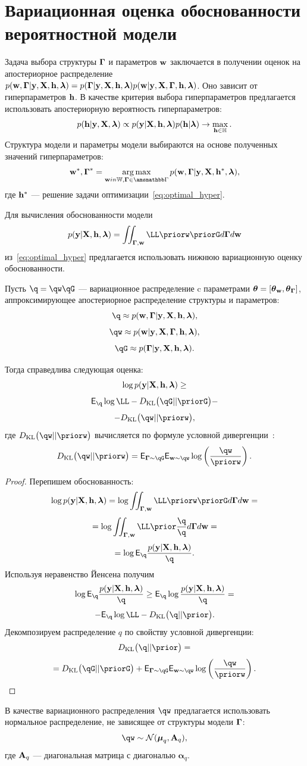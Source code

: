 \section{Вариационная оценка обоснованности вероятностной модели}
Задача выбора структуры $\boldsymbol{\Gamma}$ и параметров $\mathbf{w}$ заключается в получении оценок на апостериорное распределение $p(\mathbf{w}, \boldsymbol{\Gamma}|\mathbf{y}, \mathbf{X}, \mathbf{h},\boldsymbol{\lambda}) = p(\boldsymbol{\Gamma}|\mathbf{y}, \mathbf{X}, \mathbf{h},\boldsymbol{\lambda})p(\mathbf{w}|\mathbf{y}, \mathbf{X}, \boldsymbol{\Gamma}, \mathbf{h},\boldsymbol{\lambda})$. Оно зависит от гиперпараметров $\mathbf{h}$. 
В качестве критерия выбора гиперпараметров предлагается использовать апостериорную вероятность гиперпараметров:
\begin{equation}
\label{eq:optimal_hyper}
    p(\mathbf{h}|\mathbf{y}, \mathbf{X},\boldsymbol{\lambda}) \propto p(\mathbf{y}|\mathbf{X}, \mathbf{h},\boldsymbol{\lambda}) p(\mathbf{h}|\boldsymbol{\lambda}) \to \max_{\mathbf{h} \in \mathbb{H}}.
\end{equation}
Структура модели и параметры модели выбираются на основе полученных значений гиперпараметров:
\[
    \w^*,\G^* = \argmax_{\w in \Wb, \G \in \Gb} p(\w, \G|\y, \X, \h^*, \lam ),
\]
где $\mathbf{h}^*$ --- решение задачи оптимизации~\eqref{eq:optimal_hyper}.

Для вычисления обоснованности модели $$\EV = \iint_{\G, \w}\LL \priorw \priorG d\G d\w$$ из~\eqref{eq:optimal_hyper} предлагается использовать нижнюю вариационную оценку обоснованности.

\begin{theorem}
Пусть $\q = \qw \qG$ --- вариационное распределение c параметрами $\boldsymbol{\theta}= [\boldsymbol{\theta}_\mathbf{w}, \boldsymbol{\theta}_{\boldsymbol{\Gamma}} ]$, аппроксимирующее апостериорное распределение структуры и параметров:
\[
    \q \approx \post,
\]
\[
    \qw  \approx \postw,
\]
\[
    \qG \approx \postG.
\]

Тогда справедлива следующая оценка:
\begin{equation}
\label{eq:full_elbo}
\log p(\mathbf{y}|\mathbf{X}, \mathbf{h},\boldsymbol{\lambda}) \geq
\end{equation}
\[
 \E_{\q}  \log \LL - \KL{\qG}{\priorG} - 
\]
\[
 - \KL{\qw}{\priorw},
\]
где $\KL{\qw}{\priorw}$ вычисляется по формуле условной дивергенции~\cite{TODO}:
\[
\KL{\qw}{\priorw} = \E_{\G \sim \qG} \E_{\w \sim \qw} \log \left(\frac{\qw}{\priorw}\right).
\]
\end{theorem}

\begin{proof}
Перепишем обоснованность:
\[
\log \EV  =  \log \iint_{\G,\w} \LL \priorw \priorG d\G d\w  =
\]
\[
   = \log\iint_{\G,\w} \LL \prior  \frac{\q}{\q}d\G d\w =
\]
\[
  =  \log \E_{\q} \frac{\EV}{\q}.
\]
Используя неравенство Йенсена получим 
\[
 \log \E_{\q} \frac{\EV}{\q} \geq  \E_{\q}\log \frac{\EV}{\q} = 
\]
\[
 -  \E_{\q} \log \LL - \KL{\q}{\prior}.
\]
Декомпозируем распределение $q$ по свойству условной дивергенции:
\[
\KL{\q}{\prior} = 
\]
\begin{equation}
\label{eq:kl_full}
= \KL{\qG}{\priorG} + \E_{\G \sim \qG} \E_{\w \sim \qw} \log \left(\frac{\qw}{\priorw}\right).    
\end{equation}
\end{proof}
В качестве вариационного распределения $\qw$ предлагается использовать нормальное распределение, не зависящее от структуры модели $\boldsymbol{\Gamma}$:
\[
    \qw  \sim \mathcal{N}(\boldsymbol{\mu}_q, \A_q), 
\]
где $\mathbf{A}_q$ --- диагональная матрица с диагональю $\boldsymbol{\alpha}_q$.

